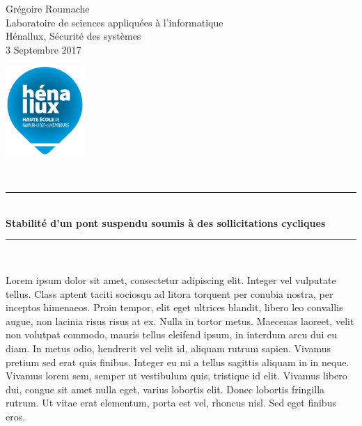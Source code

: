 \documentclass[a4paper]{article}
\newcommand{\HRule}{\rule{\linewidth}{0.5mm}}
\begin{document}
\begin{sffamily}
    \begin{center}

        \begin{minipage}{0.6\textwidth}
            \begin{flushleft} \large
                Grégoire Roumache \\ \vspace{0.2cm}
                Laboratoire de sciences appliquées à l'informatique \\
                Hénallux, Sécurité des systèmes \\ \vspace{0.2cm}
                3 Septembre 2017
            \end{flushleft}
        \end{minipage}
        \begin{minipage}{0.35\textwidth}
            \begin{flushright} \large
                \includegraphics[width=3cm]{images/LogoHenallux.PNG}~\\[0.5cm]
            \end{flushright}
        \end{minipage} \\[0.7cm]

        \HRule \\[0.4cm]
        { \huge \bfseries Stabilité d’un pont suspendu soumis à des sollicitations cycliques\\[0.4cm] }
        \HRule \\[1cm]

    \end{center}
\end{sffamily}










Lorem ipsum dolor sit amet, consectetur adipiscing elit. Integer vel vulputate tellus. Class aptent taciti sociosqu ad litora torquent per conubia nostra, per inceptos himenaeos. Proin tempor, elit eget ultrices blandit, libero leo convallis augue, non lacinia risus risus at ex. Nulla in tortor metus. Maecenas laoreet, velit non volutpat commodo, mauris tellus eleifend ipsum, in interdum arcu dui eu diam. In metus odio, hendrerit vel velit id, aliquam rutrum sapien. Vivamus pretium sed erat quis finibus. Integer eu mi a tellus sagittis aliquam in in neque. Vivamus lorem sem, semper ut vestibulum quis, tristique id elit. Vivamus libero dui, congue sit amet nulla eget, varius lobortis elit. Donec lobortis fringilla rutrum. Ut vitae erat elementum, porta est vel, rhoncus nisl. Sed eget finibus eros.
\end{document}

